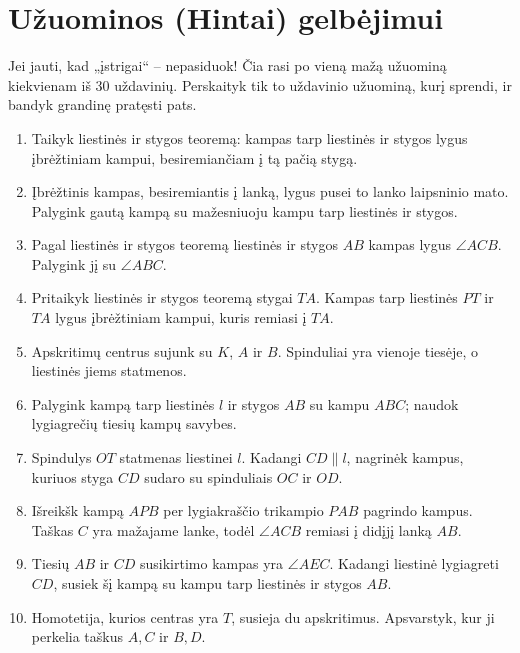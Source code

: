 \documentclass[11pt,a4paper]{scrartcl}
\begin{document}
\newpage
\section{Užuominos (Hintai) gelbėjimui}

Jei jauti, kad „įstrigai“ – nepasiduok! Čia rasi po vieną mažą užuominą kiekvienam iš 30 uždavinių. Perskaityk tik to uždavinio užuominą, kurį sprendi, ir bandyk grandinę pratęsti pats.

\begin{enumerate}
    \renewcommand{\labelenumi}{\textbf{\theenumi.}}

    \item Taikyk liestinės ir stygos teoremą: kampas tarp liestinės ir stygos lygus įbrėžtiniam kampui, besiremiančiam į tą pačią stygą.
    \item Įbrėžtinis kampas, besiremiantis į lanką, lygus pusei to lanko laipsninio mato. Palygink gautą kampą su mažesniuoju kampu tarp liestinės ir stygos.
    \item Pagal liestinės ir stygos teoremą liestinės ir stygos $AB$ kampas lygus $\angle ACB$. Palygink jį su $\angle ABC$.
    \item Pritaikyk liestinės ir stygos teoremą stygai $TA$. Kampas tarp liestinės $PT$ ir $TA$ lygus įbrėžtiniam kampui, kuris remiasi į $TA$.
    \item Apskritimų centrus sujunk su $K$, $A$ ir $B$. Spinduliai yra vienoje tiesėje, o liestinės jiems statmenos.
    \item Palygink kampą tarp liestinės $l$ ir stygos $AB$ su kampu $ABC$; naudok lygiagrečių tiesių kampų savybes.
    \item Spindulys $OT$ statmenas liestinei $l$. Kadangi $CD\parallel l$, nagrinėk kampus, kuriuos styga $CD$ sudaro su spinduliais $OC$ ir $OD$.
    \item Išreikšk kampą $APB$ per lygiakraščio trikampio $PAB$ pagrindo kampus. Taškas $C$ yra mažajame lanke, todėl $\angle ACB$ remiasi į didįjį lanką $AB$.
    \item Tiesių $AB$ ir $CD$ susikirtimo kampas yra $\angle AEC$. Kadangi liestinė lygiagreti $CD$, susiek šį kampą su kampu tarp liestinės ir stygos $AB$.
    \item Homotetija, kurios centras yra $T$, susieja du apskritimus. Apsvarstyk, kur ji perkelia taškus $A,C$ ir $B,D$.
\end{enumerate}
\end{document}

